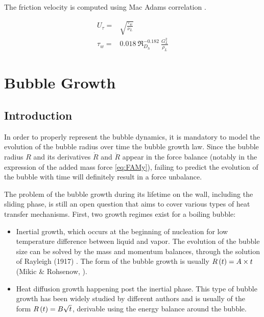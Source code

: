 The friction velocity is computed using Mac Adams correlation \cite{mcadams_heat_1954}.

\begin{align}
U_{\tau} =& \sqrt{\frac{\tau_{w}}{\nu_{L}}}
\label{eq:utau_mcadams}\\
\tau_{w} =& 0.018~ \Re_{D_{h}}^{-0.182}~ \frac{G_{L}^{2}}{\rho_{L}}
\end{align}

\newpage


\section{Bubble Growth}
\label{sec:bub_growth}

\subsection{Introduction}

In order to properly represent the bubble dynamics, it is mandatory to model the evolution of the bubble radius over time \ie the bubble growth law. Since the bubble radius $R$ and its derivatives $\dot{R}$ and $\ddot{R}$ appear in the force balance (notably in the expression of the added mass force \ref{eq:FAMy}), failing to predict the evolution of the bubble with time will definitely result in a force unbalance.

\npar
The problem of the bubble growth during its lifetime on the wall, including the sliding phase, is still an open question that aims to cover various types of heat transfer mechanisms. First, two growth regimes exist for a boiling bubble:

\begin{itemize}
\item Inertial growth, which occurs at the beginning of nucleation for low temperature difference between liquid and vapor. The evolution of the bubble size can be solved by the mass and momentum balances, through the solution of Rayleigh (1917) \cite{rayleigh_viii_1917}. The form of the bubble growth is usually $R\left( t \right) = A\times t$ (Mikic \& Rohsenow, \cite{mikic_bubble_1970}).

\item Heat diffusion growth happening post the inertial phase. This type of bubble growth has been widely studied by different authors \cite{plesset_growth_1954, scriven_dynamics_1959, zuber_dynamics_1961, mikic_bubble_1970} and is usually of the form $R\left( t \right) = B\sqrt{t}$, derivable using the energy balance around the bubble.
\end{itemize}


